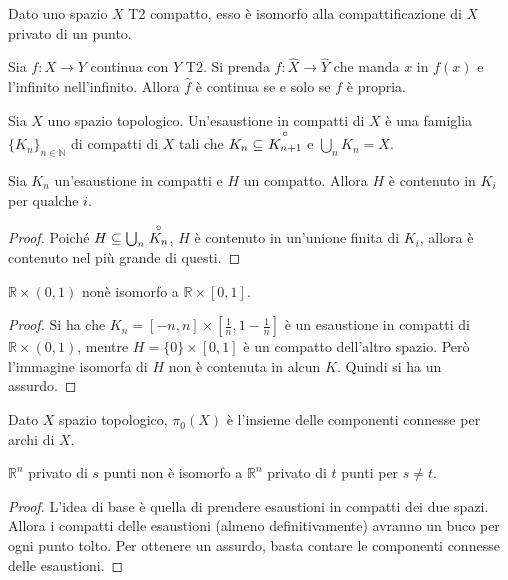 \begin{cor}
    Dato uno spazio $X$ T2 compatto, esso \`e isomorfo alla compattificazione di $X$ privato di un punto.
\end{cor}

\begin{prop}
    Sia $f\colon X \longrightarrow Y$ continua con $Y$ T2. Si prenda ${\hat{f}\colon \hat{X}\longrightarrow\hat{Y}}$ che manda $x$ in $f(x)$ e l'infinito nell'infinito. Allora $\hat{f}$ \`e continua se e solo se $f$ \`e propria.
\end{prop}

\begin{defn}
    Sia $X$ uno spazio topologico. Un'esaustione in compatti di $X$ \`e una famiglia ${\{K_n\}_{n\in\mathbb{N}}}$ di compatti di $X$ tali che ${K_n\subseteq\ \open{K_{n+1}}}$ e $\bigcup_nK_n = X$.
\end{defn}

\begin{prop}
    Sia $K_n$ un'esaustione in compatti e $H$ un compatto. Allora $H$ \`e contenuto in $K_i$ per qualche $i$.
\end{prop}
\begin{proof}
    Poich\'e $H\subseteq \bigcup_n\stackrel{\circ}{K_n}$, $H$ \`e contenuto in un'unione finita di $K_i$, allora \`e contenuto nel pi\`u grande di questi.
\end{proof}

\begin{ex}
    $\mathbb{R}\times(0,1)$ non\`e isomorfo a $\mathbb{R}\times[0,1]$.
\end{ex}
\begin{proof}
    Si ha che $K_n = [-n,n]\times[\frac{1}{n}, 1-\frac{1}{n}]$ \`e un esaustione in compatti di $\mathbb{R}\times(0,1)$, mentre $H=\{0\}\times[0,1]$ \`e un compatto dell'altro spazio. Per\`o l'immagine isomorfa di $H$ non \`e contenuta in alcun $K$. Quindi si ha un assurdo.
\end{proof}

\begin{defn}
    Dato $X$ spazio topologico, $\pi_0(X)$ \`e l'insieme delle componenti connesse per archi di $X$.
\end{defn}

\begin{ex}
    $\mathbb{R}^n$ privato di $s$ punti non \`e isomorfo a $\mathbb{R}^n$
    privato di $t$ punti per $s\ne t$.
\end{ex}
\begin{proof}
    L'idea di base \`e quella di prendere esaustioni in compatti dei due spazi.
    Allora i compatti delle esaustioni (almeno definitivamente) avranno un buco per ogni punto tolto. Per ottenere un assurdo, basta contare le componenti connesse delle esaustioni.
\end{proof}
